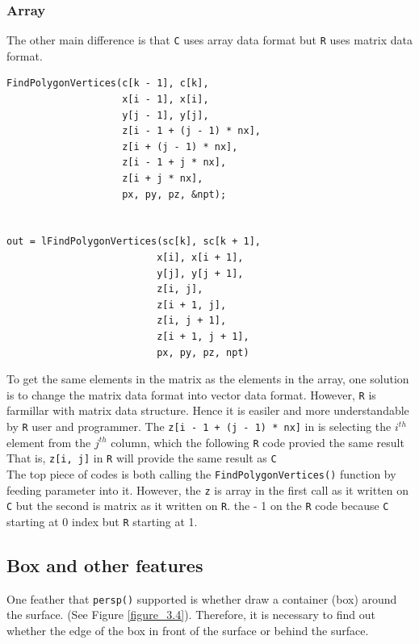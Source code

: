 \documentclass[paper=a4, fontsize=11pt]{report}
\begin{document}
\subsubsection{Array}
The other main difference is that \texttt{C} uses array data format but \texttt{R} uses matrix data format. 
\begin{lstlisting}
FindPolygonVertices(c[k - 1], c[k],
                    x[i - 1], x[i],
                    y[j - 1], y[j],
                    z[i - 1 + (j - 1) * nx],
                    z[i + (j - 1) * nx],
                    z[i - 1 + j * nx],
                    z[i + j * nx],
                    px, py, pz, &npt);


out = lFindPolygonVertices(sc[k], sc[k + 1],
                          x[i], x[i + 1],
                          y[j], y[j + 1],
                          z[i, j],
                          z[i + 1, j],
                          z[i, j + 1],
                          z[i + 1, j + 1],
                          px, py, pz, npt)
\end{lstlisting}



To get the same elements in the matrix as the elements in the array, one solution is to change the matrix data format into vector data format. However, \texttt{R} is farmillar with matrix data structure. Hence it is easiler and more understandable by \texttt{R} user and programmer. The \texttt{z[i - 1 + (j - 1) * nx]} in  is selecting the $i^{th}$ element from the $j^{th}$ column, which the following \texttt{R} code provied the same result That is, \texttt{z[i, j]} in \texttt{R} will provide the same result as \texttt{C} \\


The top piece of codes is both calling the \texttt{FindPolygonVertices()} function by feeding parameter into it. However, the \texttt{z} is array in the first call as it written on \texttt{C} but the second is matrix as it written on \texttt{R}. the - 1 on the \texttt{R} code because \texttt{C} starting at 0 index but \texttt{R} starting at 1.\\

\subsection{Box and other features}
One feather that \texttt{persp()} supported is whether draw a container (box) around the surface. (See Figure \ref{figure_3.4}). Therefore, it is necessary to find out whether the edge of the box in front of the surface or behind the surface. \\ 
\end{document}
